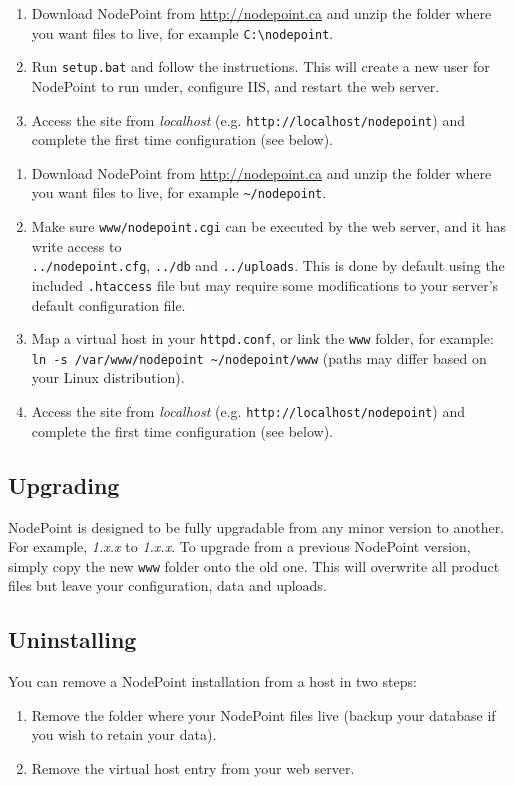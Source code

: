 \documentclass[11pt]{article}
\begin{document}
{
\begin{enumerate}
\item Download NodePoint from \url{http://nodepoint.ca} and unzip the folder where you want files to live, for example \texttt{C:\textbackslash nodepoint}.
\item Run \texttt{setup.bat} and follow the instructions. This will create a new user for NodePoint to run under, configure IIS, and restart the web server.
\item Access the site from \textit{localhost} (e.g. \texttt{http://localhost/nodepoint}) and complete the first time configuration (see below).
\end{enumerate}
}
{
\begin{enumerate}
\item Download NodePoint from \url{http://nodepoint.ca} and unzip the folder where you want files to live, for example \texttt{\textasciitilde/nodepoint}.
\item Make sure \texttt{www/nodepoint.cgi} can be executed by the web server, and it has write access to\\ \texttt{../nodepoint.cfg}, \texttt{../db} and \texttt{../uploads}. This is done by default using the included \texttt{.htaccess} file but may require some modifications to your server's default configuration file.
\item Map a virtual host in your \texttt{httpd.conf}, or link the \texttt{www} folder, for example: \texttt{ln -s /var/www/nodepoint \textasciitilde/nodepoint/www} (paths may differ based on your Linux distribution).
\item Access the site from \textit{localhost} (e.g. \texttt{http://localhost/nodepoint}) and complete the first time configuration (see below).
\end{enumerate}
}

\subsection{Upgrading}
NodePoint is designed to be fully upgradable from any minor version to another. For example, \textit{1.x.x} to \textit{1.x.x}. To upgrade from a previous NodePoint version, simply copy the new \texttt{www} folder onto the old one. This will overwrite all product files but leave your configuration, data and uploads.

\subsection{Uninstalling}
You can remove a NodePoint installation from a host in two steps:
\begin{enumerate}
\item Remove the folder where your NodePoint files live (backup your database if you wish to retain your data).
\item Remove the virtual host entry from your web server.
\end{enumerate}
\end{document}
